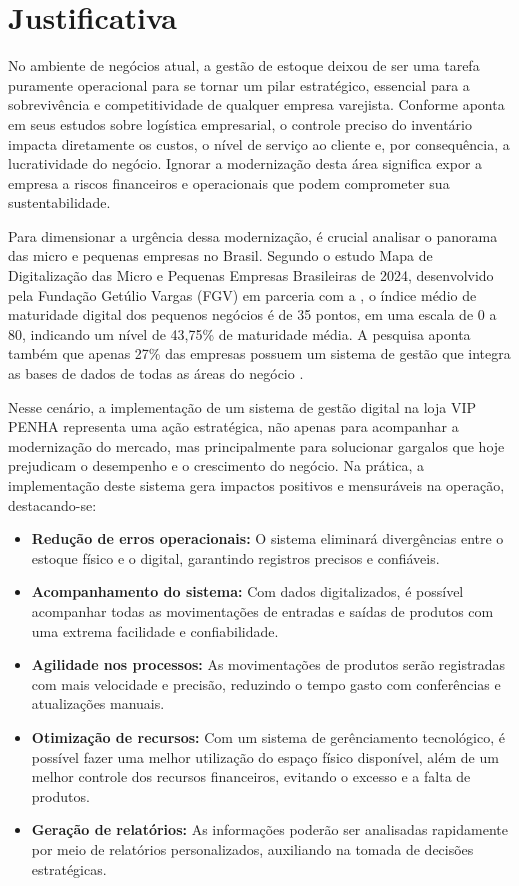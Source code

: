 \documentclass[
	12pt,				%
	openany,			%
	twoside,			%
	a4paper,			%
	english,			%
	brazil				%
	]{abntex2}
\begin{document}
\section{Justificativa}
No ambiente de negócios atual, a gestão de estoque deixou de ser uma tarefa puramente operacional para se tornar um pilar estratégico, essencial para a sobrevivência e competitividade de qualquer empresa varejista. Conforme aponta  em seus estudos sobre logística empresarial, o controle preciso do inventário impacta diretamente os custos, o nível de serviço ao cliente e, por consequência, a lucratividade do negócio. Ignorar a modernização desta área significa expor a empresa a riscos financeiros e operacionais que podem comprometer sua sustentabilidade.


Para dimensionar a urgência dessa modernização, é crucial analisar o panorama das micro e pequenas empresas no Brasil. Segundo o estudo Mapa de Digitalização das Micro e Pequenas Empresas Brasileiras de 2024, desenvolvido pela Fundação Getúlio Vargas (FGV) em parceria com a  , o índice médio de maturidade digital dos pequenos negócios é de 35 pontos, em uma escala de 0 a 80, indicando um nível de 43,75\% de maturidade média. A pesquisa aponta também que apenas 27\% das empresas possuem um sistema de gestão que integra as bases de dados de todas as áreas do negócio . 

Nesse cenário, a implementação de um sistema de gestão digital na loja VIP PENHA representa uma ação estratégica, não apenas para acompanhar a modernização do mercado, mas principalmente para solucionar gargalos que hoje prejudicam o desempenho e o crescimento do negócio. Na prática, a implementação deste sistema gera impactos positivos e mensuráveis na operação, destacando-se:

\begin{itemize}
    \item \textbf{Redução de erros operacionais:} O sistema eliminará divergências entre o estoque físico e o digital, garantindo registros precisos e confiáveis.
    \item \textbf{Acompanhamento do sistema:} Com dados digitalizados, é possível acompanhar todas as movimentações de entradas e saídas de produtos com uma extrema facilidade e confiabilidade.
    \item \textbf{Agilidade nos processos:} As movimentações de produtos serão registradas com mais velocidade e precisão, reduzindo o tempo gasto com conferências e atualizações manuais.
    \item \textbf{Otimização de recursos:} Com um sistema de gerênciamento tecnológico, é possível fazer uma melhor utilização do espaço físico disponível, além de um melhor controle dos recursos financeiros, evitando o excesso e a falta de produtos.
    \item \textbf{Geração de relatórios:} As informações poderão ser analisadas rapidamente por meio de relatórios personalizados, auxiliando na tomada de decisões estratégicas.
\end{itemize}
\end{document}
